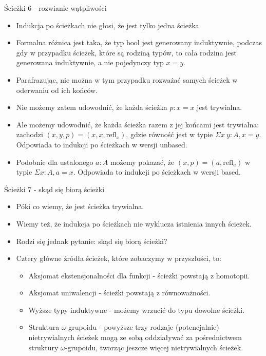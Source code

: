 \documentclass{beamer}
\newcommand{\refl}[1]{\text{refl}_{#1}}
\begin{document}
\begin{frame}{Ścieżki 6 - rozwianie wątpliwości}
\begin{itemize}
	\item Indukcja po ścieżkach nie głosi, że jest tylko jedna ścieżka.
	\item Formalna różnica jest taka, że typ $\text{bool}$ jest generowany induktywnie, podczas gdy w przypadku ścieżek, które są rodziną typów, to cała rodzina jest generowana induktywnie, a nie pojedynczy typ $x = y$.
	\item Parafrazując, nie można w tym przypadku rozważać samych ścieżek w oderwaniu od ich końców.
	\item Nie możemy zatem udowodnić, że każda ścieżka $p : x = x$ jest trywialna.
	\item Ale możemy udowodnić, że każda ścieżka razem z jej końcami jest trywialna: zachodzi $(x, y, p) = (x, x, \refl{x})$, gdzie równość jest w typie $\Sigma x\ y : A, x = y$. Odpowiada to indukcji po ścieżkach w wersji unbased.
	\item Podobnie dla ustalonego $a : A$ możemy pokazać, że $(x, p) = (a, \refl{a})$ w typie $\Sigma x : A, a = x$. Odpowiada to indukcji po ścieżkach w wersji based.
\end{itemize}
\end{frame}

\begin{frame}{Ścieżki 7 - skąd się biorą ścieżki}
\begin{itemize}
	\item Póki co wiemy, że jest ścieżka trywialna.
	\item Wiemy też, że indukcja po ścieżkach nie wyklucza istnienia innych ścieżek.
	\item Rodzi się jednak pytanie: skąd się biorą ścieżki?
	\item Cztery główne źródła ścieżek, które zobaczymy w przyszłości, to:
	\begin{itemize}
		\item Aksjomat ekstensjonalności dla funkcji - ścieżki powstają z homotopii.
		\item Aksjomat uniwalencji - ścieżki powstają z równoważności.
		\item Wyższe typy induktywne - możemy wrzucić do typu dowolne ścieżki.
		\item Struktura $\omega$-grupoidu - powyższe trzy rodzaje (potencjalnie) nietrywialnych ścieżek mogą ze sobą oddziaływać za pośrednictwem struktury $\omega$-grupoidu, tworząc jeszcze więcej nietrywialnych ścieżek. 
	\end{itemize}
\end{itemize}
\end{frame}
\end{document}
